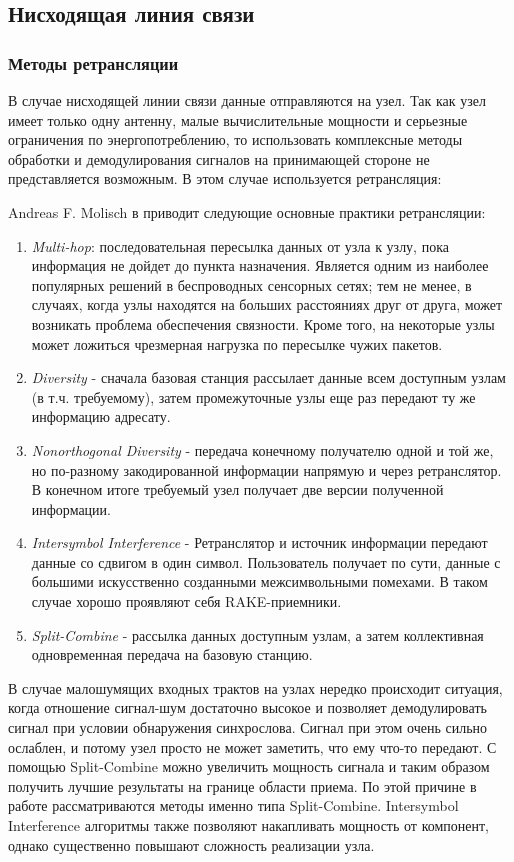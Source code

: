 \documentclass[a4paper,12pt,oneside, abstract=true]{scrartcl}
\begin{document}
\subsection{Нисходящая линия связи}
\subsubsection{Методы ретрансляции}
В случае нисходящей линии связи данные отправляются на узел. 
Так как узел имеет только одну антенну, малые вычислительные мощности и серьезные ограничения по энергопотреблению, то использовать комплексные методы обработки и демодулирования сигналов на принимающей стороне не представляется возможным. 
В этом случае используется ретрансляция:

Andreas F. Molisch в \cite{B1} приводит следующие основные практики ретрансляции:
\begin{enumerate}
\item \textit{Multi-hop}: последовательная пересылка данных от узла к узлу, пока информация не дойдет до пункта назначения. 
Является одним из наиболее популярных решений в беспроводных сенсорных сетях; тем не менее, в случаях, когда узлы находятся на больших расстояниях друг от друга, может возникать проблема обеспечения связности. 
Кроме того, на некоторые узлы может ложиться чрезмерная нагрузка по пересылке чужих пакетов.
\item \textit{Diversity} - сначала базовая станция рассылает данные всем доступным узлам (в т.ч. требуемому), затем  промежуточные узлы еще раз передают ту же информацию адресату.
\item \textit{Nonorthogonal Diversity} - передача конечному получателю одной и той же, но по-разному закодированной информации напрямую и через ретранслятор. 
В конечном итоге требуемый узел получает две версии полученной информации.
\item \textit{Intersymbol Interference} - Ретранслятор и источник информации передают данные со сдвигом в один символ. 
Пользователь получает по сути, данные с большими искусственно созданными межсимвольными помехами. В таком случае хорошо проявляют себя RAKE-приемники. \cite{A7}
\item \textit{Split-Combine} - рассылка данных доступным узлам, а затем коллективная одновременная передача на базовую станцию.
\end{enumerate}

В случае малошумящих входных трактов на узлах нередко происходит ситуация, когда отношение сигнал-шум достаточно высокое и позволяет демодулировать сигнал при условии обнаружения синхрослова. 
Сигнал при этом очень сильно ослаблен, и потому узел просто не может заметить, что ему что-то передают. 
С помощью Split-Combine можно увеличить мощность сигнала и таким образом получить лучшие результаты на границе области приема. 
По этой причине в работе рассматриваются методы именно типа Split-Combine. 
Intersymbol Interference алгоритмы также позволяют накапливать мощность от компонент, однако существенно повышают сложность реализации узла.
\end{document}
